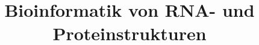 \documentclass[12pt,a4paper]{article}
\title{\Huge\textbf{Bioinformatik von RNA- und Proteinstrukturen}}
\author{}
\date{}
\begin{document}
\begin{titlepage}

\maketitle
\thispagestyle{empty}
\end{titlepage}
\newpage

\begin{titlepage}
\tableofcontents
\thispagestyle{empty}
\end{titlepage}
\newpage



\newpage



\newpage



\newpage



\newpage



\newpage



\newpage



\newpage


\newpage



\newpage



\newpage


\end{document}
